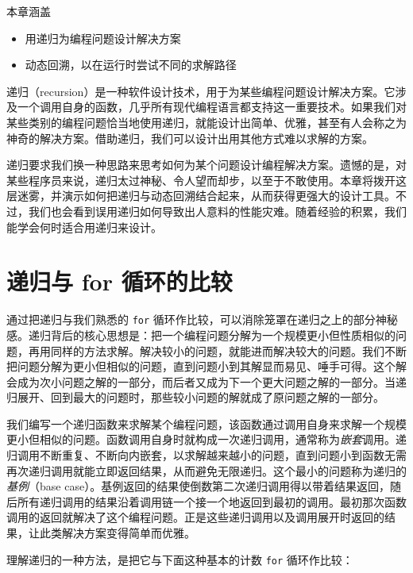 \begin{myChapterIntro}{本章涵盖}
\begin{itemize}
\item 用递归为编程问题设计解决方案
\item 动态回溯，以在运行时尝试不同的求解路径
\end{itemize}
\end{myChapterIntro}

递归（recursion）是一种软件设计技术，用于为某些编程问题设计解决方案。它涉及一个调用自身的函数，几乎所有现代编程语言都支持这一重要技术。如果我们对某些类别的编程问题恰当地使用递归，就能设计出简单、优雅，甚至有人会称之为神奇的解决方案。借助递归，我们可以设计出用其他方式难以求解的方案。


递归要求我们换一种思路来思考如何为某个问题设计编程解决方案。遗憾的是，对某些程序员来说，递归太过神秘、令人望而却步，以至于不敢使用。本章将拨开这层迷雾，并演示如何把递归与动态回溯结合起来，从而获得更强大的设计工具。不过，我们也会看到误用递归如何导致出人意料的性能灾难。随着经验的积累，我们能学会何时适合用递归来设计。

\section{递归与 for 循环的比较}

通过把递归与我们熟悉的 \texttt{for} 循环作比较，可以消除笼罩在递归之上的部分神秘感。递归背后的核心思想是：把一个编程问题分解为一个规模更小但性质相似的问题，再用同样的方法求解。解决较小的问题，就能进而解决较大的问题。我们不断把问题分解为更小但相似的问题，直到问题小到其解显而易见、唾手可得。这个解会成为次小问题之解的一部分，而后者又成为下一个更大问题之解的一部分。当递归展开、回到最大的问题时，那些较小问题的解就成了原问题之解的一部分。

我们编写一个递归函数来求解某个编程问题，该函数通过调用自身来求解一个规模更小但相似的问题。函数调用自身时就构成一次递归调用，通常称为\emph{嵌套}调用。递归调用不断重复、不断向内嵌套，以求解越来越小的问题，直到问题小到函数无需再次递归调用就能立即返回结果，从而避免无限递归。这个最小的问题称为递归的\emph{基例}（base case）。基例返回的结果使倒数第二次递归调用得以带着结果返回，随后所有递归调用的结果沿着调用链一个接一个地返回到最初的调用。最初那次函数调用的返回就解决了这个编程问题。正是这些递归调用以及调用展开时返回的结果，让此类解决方案变得简单而优雅。

理解递归的一种方法，是把它与下面这种基本的计数 \texttt{for} 循环作比较：

